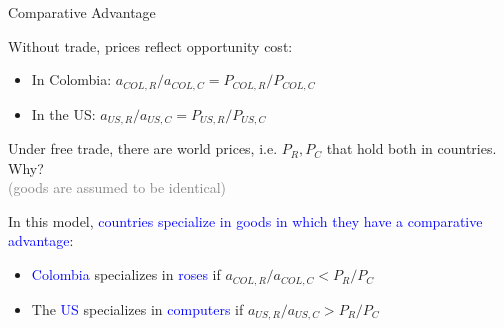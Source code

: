 \documentclass[notes,11pt, aspectratio=169, xcolor=table]{beamer}
\newcommand{\blue}[1]{\textcolor{blue}{#1}}
\newenvironment{wideitemize}{\itemize\addtolength{\itemsep}{10pt}}{\enditemize}
\begin{document}
\begin{frame}{Comparative Advantage}

\begin{wideitemize}

    \item Without trade, prices reflect opportunity cost:
    \begin{itemize}
        \item In Colombia: $a_{COL,R}/a_{COL,C} = P_{COL,R}/P_{COL,C}$
        \item In the US: $a_{US,R}/a_{US,C} = P_{US,R}/P_{US,C}$
    \end{itemize}

    \item Under free trade, there are world prices, i.e. $P_R,P_C$ that hold both in countries. Why? \\
        \qquad \textcolor{gray}{(goods are assumed to be identical)}

    \item In this model, \blue{countries specialize in goods in which they have a comparative advantage}:
    
    \begin{itemize}
        \item \blue{Colombia} specializes in \blue{roses} if $a_{COL,R}/a_{COL,C} < P_R/P_C$
        \item The \blue{US} specializes in \blue{computers} if $a_{US,R}/a_{US,C} > P_R/P_C$
    \end{itemize}

\end{wideitemize}

\end{frame}
\end{document}
